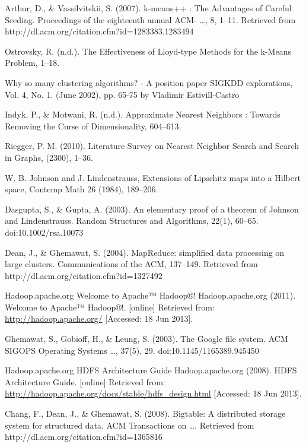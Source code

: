 \documentclass{article}
\begin{document}
\begin{thebibliography}{99}
     Arthur, D., \& Vassilvitskii, S. (2007). k-means++ : The Advantages of
        Careful Seeding. Proceedings of the eighteenth annual ACM- …, 8, 1–11.
        Retrieved from http://dl.acm.org/citation.cfm?id=1283383.1283494

     Ostrovsky, R. (n.d.). The Effectiveness of Lloyd-type
        Methods for the k-Means Problem, 1–18.

     Why so many clustering algorithms? - A position paper SIGKDD
        explorations, Vol. 4, No. 1. (June 2002), pp. 65-75 by Vladimir
        Estivill-Castro

     Indyk, P., \& Motwani, R. (n.d.). Approximate Nearest Neighbors :
        Towards Removing the Curse of Dimensionality, 604–613.

     Riegger, P. M. (2010). Literature Survey on Nearest Neighbor Search and Search in Graphs, (2300), 1–36.

     W. B. Johnson and J. Lindenstrauss, Extensions of Lipschitz maps into a Hilbert space, Contemp Math 26 (1984), 189–206.

     Dasgupta, S., \& Gupta, A. (2003). An elementary proof of a theorem of Johnson and Lindenstrauss. Random Structures and Algorithms, 22(1), 60–65. doi:10.1002/rsa.10073

     Dean, J., \& Ghemawat, S. (2004). MapReduce: simplified data
        processing on large clusters. Communications of the ACM, 137–149.
        Retrieved from http://dl.acm.org/citation.cfm?id=1327492

     Hadoop.apache.org
        Welcome to Apache™ Hadoop®!
        Hadoop.apache.org (2011). Welcome to Apache™ Hadoop®!. [online]
        Retrieved from: \url{http://hadoop.apache.org/} [Accessed: 18 Jun 2013].

     Ghemawat, S., Gobioff, H., \& Leung, S. (2003). The Google
        file system. ACM SIGOPS Operating Systems …, 37(5), 29.
        doi:10.1145/1165389.945450

     Hadoop.apache.org
        HDFS Architecture Guide
        Hadoop.apache.org (2008). HDFS Architecture Guide. [online] Retrieved
        from: \url{http://hadoop.apache.org/docs/stable/hdfs_design.html} [Accessed:
        18 Jun 2013].

     Chang, F., Dean, J., \& Ghemawat, S. (2008). Bigtable: A
        distributed storage system for structured data. ACM Transactions on ….
        Retrieved from http://dl.acm.org/citation.cfm?id=1365816


\end{thebibliography}
\end{document}
